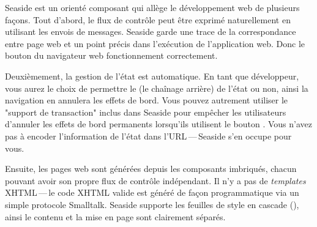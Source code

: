 \documentclass[a4paper,10pt,twoside]{book}
\begin{document}

Seaside est un \framework{} orienté composant
qui allège le développement web de plusieurs façons.
Tout d'abord, le flux de contrôle
peut être exprimé naturellement en utilisant les envois de messages.
Seaside garde une trace de la correspondance entre page web et 
un point précis dans l'exécution de l'application web.
Donc le bouton \backbtn du navigateur web fonctionnement correctement.

Deuxièmement, la gestion de l'état est automatique. %
En tant que développeur, vous aurez le choix de permettre le
\backtracking (\ie le chaînage arrière) de l'état ou non, ainsi la
navigation en \backbtn{} annulera les effets de bord.
Vous pouvez autrement utiliser le "support de transaction"
inclus dans Seaside pour empêcher les utilisateurs d'annuler les
effets de bord permanents lorsqu'ils utilisent le bouton \backbtn.
Vous n'avez pas à encoder l'information de l'état dans
l'URL\,---\,Seaside s'en occupe pour vous. 

Ensuite, les pages web sont générées depuis les composants imbriqués,
chacun pouvant avoir son propre flux de contrôle indépendant.
Il n'y a pas de \emph{templates} XHTML\,---\,le code XHTML valide est
généré de façon programmatique via un simple protocole Smalltalk.
Seaside supporte les feuilles de style en cascade 
 (), ainsi le contenu et la mise en page sont clairement
 séparés.
\end{document}
